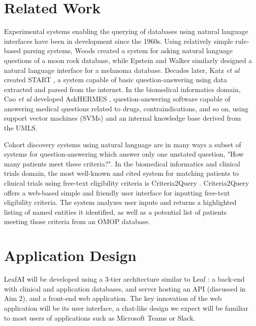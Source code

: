 \documentclass[../main.tex]{subfiles}
\begin{document}
\section{Related Work}

Experimental systems enabling the querying of databases using natural language interfaces have been in development since the 1960s. Using relatively simple rule-based parsing systems, Woods \cite{woods1973progress} created a system for asking natural language questions of a moon rock database, while Epstein and Walker \cite{epstein1978natural} similarly designed a natural language interface for a melanoma database. Decades later, Katz \textit{et al} created START \cite{katz1999integrating}, a system capable of basic question-answering using data extracted and parsed from the internet. In the biomedical informatics domain, Cao \textit{et al} developed AskHERMES \cite{cao2011askhermes}, question-answering software capable of answering medical questions related to drugs, contraindications, and so on, using support vector machines (SVMs) and an internal knowledge base derived from the UMLS.

Cohort discovery systems using natural language are in many ways a subset of systems for question-answering which answer only one unstated question, "How many patients meet these criteria?". In the biomedical informatics and clinical trials domain, the most well-known and cited system for matching patients to clinical trials using free-text eligibility criteria is Criteria2Query \cite{yuan2019criteria2query, fang2022combining}. Criteria2Query offers a web-based simple and friendly user interface for inputting free-text eligibility criteria. The system analyzes user inputs and returns a highlighted listing of named entities it identified, as well as a potential list of patients meeting those criteria from an OMOP database.

\section{Application Design}

LeafAI will be developed using a 3-tier architecture similar to Leaf \cite{dobbins2019leaf}: a back-end with clinical and application databases, and server hosting an API (discussed in Aim 2), and a front-end web application. The key innovation of the web application will be its user interface, a chat-like design we expect will be familiar to most users of applications such as Microsoft Teams or Slack.
\end{document}
